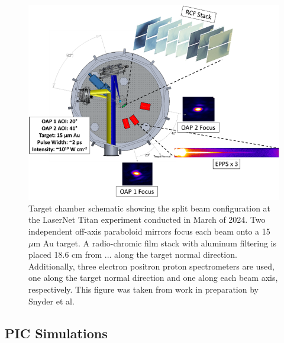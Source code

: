 \begin{figure}
	\centering
	\includegraphics[width=.95\linewidth]{planning/images/titan/target_area_JLF.png}
	\caption{Target chamber schematic showing the split beam configuration at the LaserNet Titan experiment conducted in March of 2024. Two independent off-axis paraboloid mirrors focus each beam onto a 15~$\mu$m Au target. A radio-chromic film stack with aluminum filtering is placed 18.6 cm from ... along the target normal direction. Additionally, three electron positron proton spectrometers are used, one along the target normal direction and one along each beam axis, respectively. This figure was taken from work in preparation by Snyder et al.}
	\label{fig:jlf_target_chamber}
\end{figure}

\subsection{PIC Simulations}

